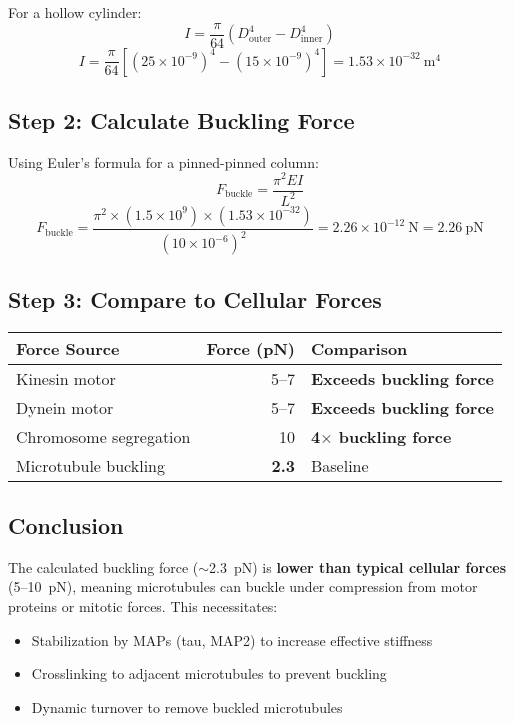 For a hollow cylinder:
\begin{equation}
I = \frac{\pi}{64}(D_{\mathrm{outer}}^4 - D_{\mathrm{inner}}^4)
\end{equation}
\begin{equation}
I = \frac{\pi}{64}[(25 \times 10^{-9})^4 - (15 \times 10^{-9})^4] = 1.53 \times 10^{-32}\ \mathrm{m}^4
\end{equation}

\subsection*{Step 2: Calculate Buckling Force}

Using Euler's formula for a pinned-pinned column:
\begin{equation}
F_{\mathrm{buckle}} = \frac{\pi^2 EI}{L^2}
\end{equation}
\begin{equation}
F_{\mathrm{buckle}} = \frac{\pi^2 \times (1.5 \times 10^9) \times (1.53 \times 10^{-32})}{(10 \times 10^{-6})^2} = 2.26 \times 10^{-12}\ \mathrm{N} = 2.26\ \mathrm{pN}
\end{equation}

\subsection*{Step 3: Compare to Cellular Forces}

\begin{center}
\begin{tabular}{@{}lrl@{}}
\toprule
Force Source & \multicolumn{1}{c}{Force (pN)} & Comparison \\
\midrule
Kinesin motor & 5--7 & \textbf{Exceeds buckling force} \\
Dynein motor & 5--7 & \textbf{Exceeds buckling force} \\
Chromosome segregation & 10 & \textbf{4$\times$ buckling force} \\
Microtubule buckling & \textbf{2.3} & Baseline \\
\bottomrule
\end{tabular}
\end{center}

\subsection*{Conclusion}

The calculated buckling force ($\sim$2.3~pN) is \textbf{lower than typical cellular forces} (5--10~pN), meaning microtubules can buckle under compression from motor proteins or mitotic forces. This necessitates:
\begin{itemize}
\item Stabilization by MAPs (tau, MAP2) to increase effective stiffness
\item Crosslinking to adjacent microtubules to prevent buckling
\item Dynamic turnover to remove buckled microtubules
\end{itemize}

